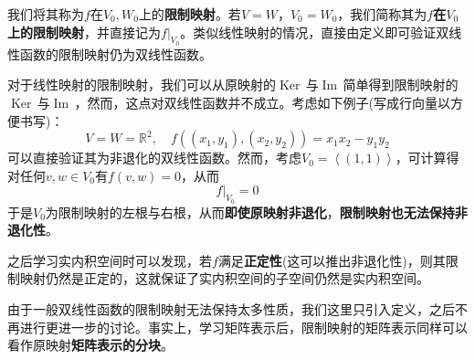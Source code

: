 \documentclass[a4paper,UTF8,fontset=windows,AutoFakeBold]{ctexart}
\DeclareMathOperator{\im}{Im\,}
\DeclareMathOperator{\Ker}{Ker\,}
\newcommand*{\note}{\noindent *}
\begin{document}
我们将其称为$f$在$V_0,W_0$上的\textbf{限制映射}。若$V=W$，$V_0=W_0$，我们简称其为\textbf{$f$在$V_0$上的限制映射}，并直接记为$f|_{V_0}$。类似线性映射的情况，直接由定义即可验证双线性函数的限制映射仍为双线性函数。

对于线性映射的限制映射，我们可以从原映射的$\Ker$与$\im$简单得到限制映射的$\Ker$与$\im$，然而，这点对双线性函数并不成立。考虑如下例子(写成行向量以方便书写)：
$$V=W=\mathbb{R}^2,\quad f((x_1,y_1),(x_2,y_2))=x_1x_2-y_1y_2$$
可以直接验证其为非退化的双线性函数。然而，考虑$V_0=\left<(1,1)\right>$，可计算得对任何$v,w\in V_0$有$f(v,w)=0$，从而
$$f|_{V_0}=0$$
于是$V_0$为限制映射的左根与右根，从而\textbf{即使原映射非退化}，\textbf{限制映射也无法保持非退化性}。

\note 之后学习实内积空间时可以发现，若$f$满足\textbf{正定性}(这可以推出非退化性)，则其限制映射仍然是正定的，这就保证了实内积空间的子空间仍然是实内积空间。

\note 由于一般双线性函数的限制映射无法保持太多性质，我们这里只引入定义，之后不再进行更进一步的讨论。事实上，学习矩阵表示后，限制映射的矩阵表示同样可以看作原映射\textbf{矩阵表示的分块}。

\
\end{document}
